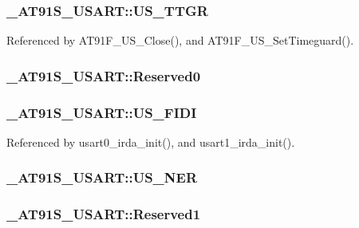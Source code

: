 \hypertarget{struct__AT91S__USART_9d0df3b329e992ee3dbd3ace22421087}{
\subsubsection{ {\bf \_\-AT91S\_\-USART::US\_\-TTGR}}}
\label{struct__AT91S__USART_9d0df3b329e992ee3dbd3ace22421087}




Referenced by AT91F\_\-US\_\-Close(), and AT91F\_\-US\_\-SetTimeguard().\hypertarget{struct__AT91S__USART_b6e09edeb5fc1310ca1222e857c76176}{
\subsubsection{ {\bf \_\-AT91S\_\-USART::Reserved0}}}
\label{struct__AT91S__USART_b6e09edeb5fc1310ca1222e857c76176}


\hypertarget{struct__AT91S__USART_def923bfc125bf851683efb2f8ac6ba7}{
\subsubsection{ {\bf \_\-AT91S\_\-USART::US\_\-FIDI}}}
\label{struct__AT91S__USART_def923bfc125bf851683efb2f8ac6ba7}




Referenced by usart0\_\-irda\_\-init(), and usart1\_\-irda\_\-init().\hypertarget{struct__AT91S__USART_95a4a7f55207ab606cced3b0eb15a48a}{
\subsubsection{ {\bf \_\-AT91S\_\-USART::US\_\-NER}}}
\label{struct__AT91S__USART_95a4a7f55207ab606cced3b0eb15a48a}


\hypertarget{struct__AT91S__USART_7e05a3f231462070b17618e77925b7ea}{
\subsubsection{ {\bf \_\-AT91S\_\-USART::Reserved1}}}
\label{struct__AT91S__USART_7e05a3f231462070b17618e77925b7ea}


